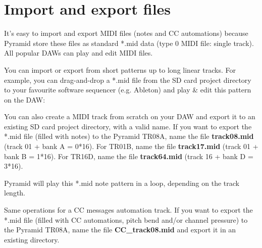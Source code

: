 \section{Import and export files}

It's easy to import and export MIDI files (notes and CC automations) because Pyramid store these files as standard *.mid data (type 0 MIDI file: single track). All popular DAWs can play and edit MIDI files.

You can import or export from short patterns up to long linear tracks. For example, you can drag-and-drop a *.mid file from the SD card project directory to your favourite software sequencer (e.g. Ableton) and play \& edit this pattern on the DAW:


You can also create a MIDI track from scratch on your DAW and export it to an existing SD card project directory, with a valid name. If you want to export the *.mid file (filled with notes) to the Pyramid TR08A, name the file \textbf{track08.mid} (track 01 + bank A = 0*16). For TR01B, name the file \textbf{track17.mid} (track 01 + bank B = 1*16). For TR16D, name the file \textbf{track64.mid} (track 16 + bank D = 3*16).

Pyramid will play this *.mid note pattern in a loop, depending on the track length.

Same operations for a CC messages automation track. If you want to export the *.mid file (filled with CC automations, pitch bend and/or channel pressure) to the Pyramid TR08A, name the file \textbf{CC\_track08.mid} and export it in an existing directory.
